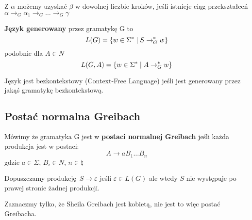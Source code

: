 Z \( \alpha \) możemy uzyskać \( \beta \) w dowolnej liczbie kroków, jeśli istnieje ciąg przekształceń \( \alpha \rightarrow_G \alpha_1 \rightarrow_G \dots \rightarrow_G \gamma \)


\begin{definition}
    \textbf{Język  generowany} przez gramatykę G to 
    \[
        L(G) = \set{w \in \Sigma^* \mid S \rightarrow_G^* w}
    \]
    podobnie dla \( A \in N \)
    \[
        L(G, A) = \set{w \in \Sigma^* \mid A \rightarrow_G^* w}
    \]
\end{definition}

\begin{definition}
    Język jest bezkontekstowy (Context-Free Language) jeśli jest generowany przez jakąś gramatykę bezkontekstową.
\end{definition}

\subsection{Postać normalna Greibach}

\begin{definition}
    Mówimy że gramatyka G jest w \textbf{postaci normalnej Greibach} jeśli każda produkcja jest w postaci:
    \[
        A \rightarrow aB_1\dots B_n
    \]
    gdzie \( a \in \Sigma \), \( B_i \in N \), \( n \in \natural \)
    
    Dopuszczamy produkcję \( S \rightarrow \varepsilon \) jeśli \( \varepsilon \in L(G) \) ale wtedy \( S \) nie występuje po prawej stronie żadnej produkcji.
\end{definition}

Zaznaczmy tylko, że Sheila Greibach jest kobietą, nie jest to więc postać Greibacha.